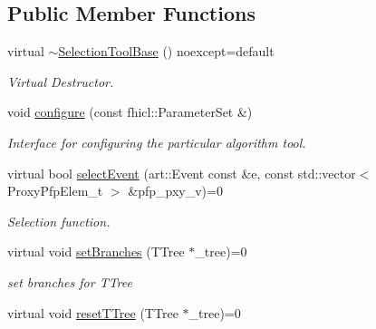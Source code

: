 \subsection*{Public Member Functions}
\begin{DoxyCompactItemize}
\item 
virtual \hyperlink{classselection_1_1SelectionToolBase_a79885af9ff5ab77d239d8484c22ac87e}{$\sim$\+Selection\+Tool\+Base} () noexcept=default\hypertarget{classselection_1_1SelectionToolBase_a79885af9ff5ab77d239d8484c22ac87e}{}\label{classselection_1_1SelectionToolBase_a79885af9ff5ab77d239d8484c22ac87e}

\begin{DoxyCompactList}\small\item\em Virtual Destructor. \end{DoxyCompactList}\item 
void \hyperlink{classselection_1_1SelectionToolBase_a36b68431bd5d3f815619d989faa7ef02}{configure} (const fhicl\+::\+Parameter\+Set \&)
\begin{DoxyCompactList}\small\item\em Interface for configuring the particular algorithm tool. \end{DoxyCompactList}\item 
virtual bool \hyperlink{classselection_1_1SelectionToolBase_ab63818dac49b43418fe9eb3b8cd98c9c}{select\+Event} (art\+::\+Event const \&e, const std\+::vector$<$ Proxy\+Pfp\+Elem\+\_\+t $>$ \&pfp\+\_\+pxy\+\_\+v)=0
\begin{DoxyCompactList}\small\item\em Selection function. \end{DoxyCompactList}\item 
virtual void \hyperlink{classselection_1_1SelectionToolBase_aa97ea5e55391240d8e251dae13897996}{set\+Branches} (T\+Tree $\ast$\+\_\+tree)=0\hypertarget{classselection_1_1SelectionToolBase_aa97ea5e55391240d8e251dae13897996}{}\label{classselection_1_1SelectionToolBase_aa97ea5e55391240d8e251dae13897996}

\begin{DoxyCompactList}\small\item\em set branches for T\+Tree \end{DoxyCompactList}\item 
virtual void \hyperlink{classselection_1_1SelectionToolBase_ae51d9c23ceee13bebf196d6535d5f1a5}{reset\+T\+Tree} (T\+Tree $\ast$\+\_\+tree)=0\hypertarget{classselection_1_1SelectionToolBase_ae51d9c23ceee13bebf196d6535d5f1a5}{}\label{classselection_1_1SelectionToolBase_ae51d9c23ceee13bebf196d6535d5f1a5}


\end{DoxyCompactItemize}
